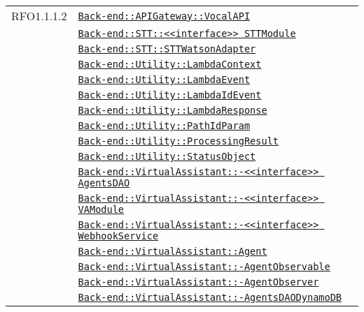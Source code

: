 \begin{longtable}{|>{\centering}m{3cm}|m{10cm}<{\centering}|}
RFO1.1.1.2 & \hyperref[Back-end::APIGateway::VocalAPI]{\texttt{Back-end::APIGateway::VocalAPI}}\\
& \hyperref[Back-end::STT::<<interface>> STTModule]{\texttt{Back-end::STT::<<interface>> STTModule}}\\
& \hyperref[Back-end::STT::STTWatsonAdapter]{\texttt{Back-end::STT::STTWatsonAdapter}}\\
& \hyperref[Back-end::Utility::LambdaContext]{\texttt{Back-end::Utility::LambdaContext}}\\
& \hyperref[Back-end::Utility::LambdaEvent]{\texttt{Back-end::Utility::LambdaEvent}}\\
& \hyperref[Back-end::Utility::LambdaIdEvent]{\texttt{Back-end::Utility::LambdaIdEvent}}\\
& \hyperref[Back-end::Utility::LambdaResponse]{\texttt{Back-end::Utility::LambdaResponse}}\\
& \hyperref[Back-end::Utility::PathIdParam]{\texttt{Back-end::Utility::PathIdParam}}\\
& \hyperref[Back-end::Utility::ProcessingResult]{\texttt{Back-end::Utility::ProcessingResult}}\\
& \hyperref[Back-end::Utility::StatusObject]{\texttt{Back-end::Utility::StatusObject}}\\
& \hyperref[Back-end::VirtualAssistant::<<interface>> AgentsDAO]{\texttt{Back-end::VirtualAssistant::-\linebreak <<interface>> AgentsDAO}}\\
& \hyperref[Back-end::VirtualAssistant::<<interface>> VAModule]{\texttt{Back-end::VirtualAssistant::-\linebreak <<interface>> VAModule}}\\
& \hyperref[Back-end::VirtualAssistant::<<interface>> WebhookService]{\texttt{Back-end::VirtualAssistant::-\linebreak <<interface>> WebhookService}}\\
& \hyperref[Back-end::VirtualAssistant::Agent]{\texttt{Back-end::VirtualAssistant::Agent}}\\
& \hyperref[Back-end::VirtualAssistant::AgentObservable]{\texttt{Back-end::VirtualAssistant::-\linebreak AgentObservable}}\\
& \hyperref[Back-end::VirtualAssistant::AgentObserver]{\texttt{Back-end::VirtualAssistant::-\linebreak AgentObserver}}\\
& \hyperref[Back-end::VirtualAssistant::AgentsDAODynamoDB]{\texttt{Back-end::VirtualAssistant::-\linebreak AgentsDAODynamoDB}}\\

\end{longtable}
